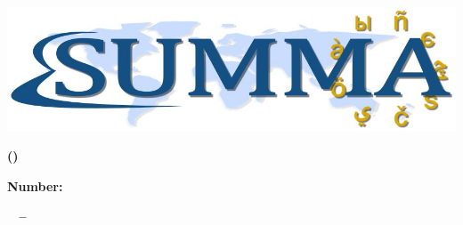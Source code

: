 \def\Reg{\raisebox{1ex}{\kern-.1em\setbox\@tempboxa\hbox{\footnotesize$\bigcirc$}\hbox
  to 0pt{\hbox to\wd\@tempboxa{\hss\tiny R\hss}\hss}\box\@tempboxa\kern-.1em}}

\pagestyle{fancy}
\chead{}
\lfoot{}
\rfoot{}
\setlength{\headheight}{16pt}
\renewcommand{\headrulewidth}{2.0pt}
\renewcommand{\footrulewidth}{2.0pt}

\renewcommand\arraystretch{1.1}

\newcommand{\tm}{\textsuperscript{\textregistered}}




	\hfill
	\centerline{\includegraphics[width=\textwidth]{./images/SummaLogoFinal.jpg}}

	\bigskip
	\begin{center}
	\textbf{\LARGE\sffamily \ProjectTitle}
	
	\smallskip
	\textbf{\LARGE\sffamily(\ProjectAcronym)}

	\bigskip
	\textbf{\Large {\FundingScheme}}

	\smallskip
	\textbf{\Large Number: \GrantNo}

	\smallskip
	\textbf{\Large \DeliverableNumber ~ -- ~\DeliverableName}

	\end{center}


